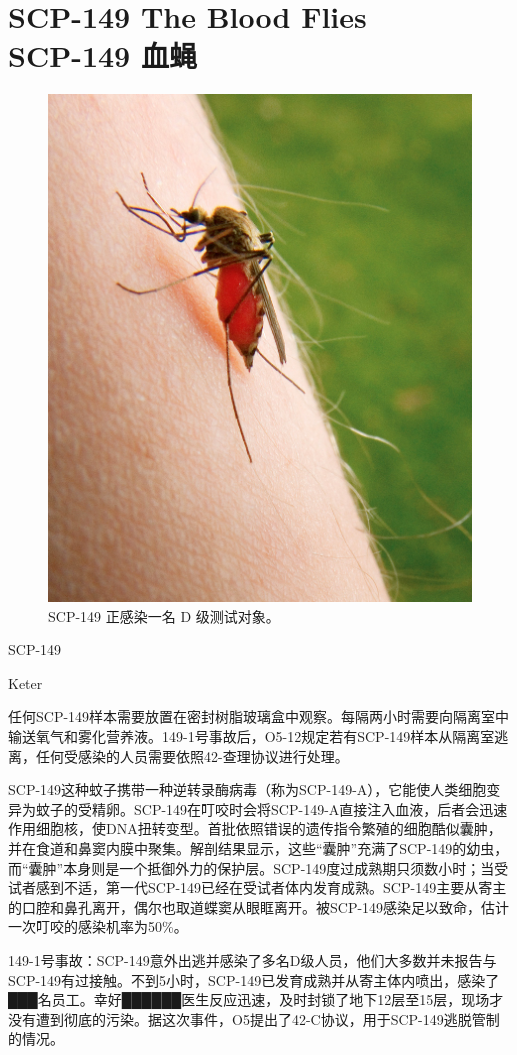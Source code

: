 \chapter[SCP-149 血蝇]{
    SCP-149 The Blood Flies\\
    SCP-149 血蝇
}

\label{chap:SCP-149}

\begin{figure}[H]
    \centering
    \includegraphics[width=0.5\linewidth]{images/SCP.149.jpg}
    \caption*{SCP-149 正感染一名 D 级测试对象。}
\end{figure}

SCP-149

Keter

任何SCP-149样本需要放置在密封树脂玻璃盒中观察。每隔两小时需要向隔离室中输送氧气和雾化营养液。149-1号事故后，O5-12规定若有SCP-149样本从隔离室逃离，任何受感染的人员需要依照42-查理协议进行处理。

SCP-149这种蚊子携带一种逆转录酶病毒（称为SCP-149-A），它能使人类细胞变异为蚊子的受精卵。SCP-149在叮咬时会将SCP-149-A直接注入血液，后者会迅速作用细胞核，使DNA扭转变型。首批依照错误的遗传指令繁殖的细胞酷似囊肿，并在食道和鼻窦内膜中聚集。解剖结果显示，这些“囊肿”充满了SCP-149的幼虫，而“囊肿”本身则是一个抵御外力的保护层。SCP-149度过成熟期只须数小时；当受试者感到不适，第一代SCP-149已经在受试者体内发育成熟。SCP-149主要从寄主的口腔和鼻孔离开，偶尔也取道蝶窦从眼眶离开。被SCP-149感染足以致命，估计一次叮咬的感染机率为50\%。


149-1号事故：SCP-149意外出逃并感染了多名D级人员，他们大多数并未报告与SCP-149有过接触。不到5小时，SCP-149已发育成熟并从寄主体内喷出，感染了███名员工。幸好██████医生反应迅速，及时封锁了地下12层至15层，现场才没有遭到彻底的污染。据这次事件，O5提出了42-C协议，用于SCP-149逃脱管制的情况。

